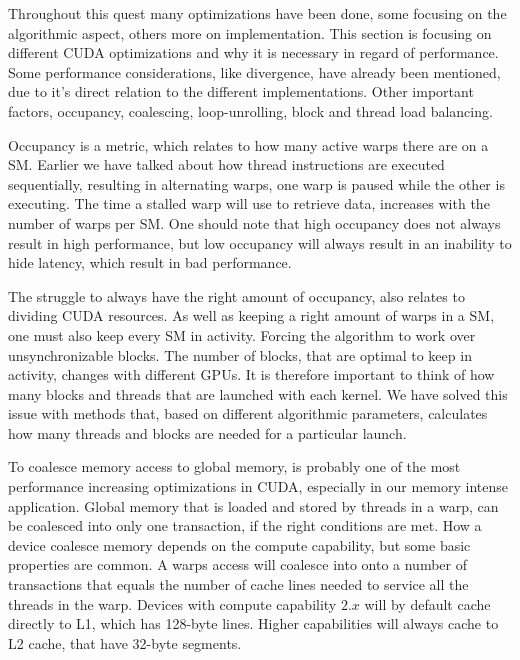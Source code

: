 Throughout this quest many optimizations have been done, some focusing on the algorithmic aspect, others more on implementation. This section is focusing on different CUDA optimizations and why it is necessary in regard of performance. Some performance considerations, like divergence, have already been mentioned, due to it's direct relation to the different implementations. Other important factors, occupancy, coalescing, loop-unrolling, block and thread load balancing.

Occupancy is a metric, which relates to how many active warps there are on a SM. Earlier we have talked about how thread instructions are executed sequentially, resulting in alternating warps, one warp is paused while the other is executing. The time a stalled warp will use to retrieve data, increases with the number of warps per SM. One should note that high occupancy does not always result in high performance, but low occupancy will always result in an inability to hide latency, which result in bad performance.

The struggle to always have the right amount of occupancy, also relates to dividing CUDA resources. As well as keeping a right amount of warps in a SM, one must also keep every SM in activity. Forcing the algorithm to work over unsynchronizable blocks. The number of blocks, that are optimal to keep in activity, changes with different GPUs. It is therefore important to think of how many blocks and threads that are launched with each kernel. We have solved this issue with methods that, based on different algorithmic parameters, calculates how many threads and blocks are needed for a particular launch.

To coalesce memory access to global memory, is probably one of the most performance increasing optimizations in CUDA, especially in our memory intense application. Global memory that is loaded and stored by threads in a warp, can be coalesced into only one transaction, if the right conditions are met. How a device coalesce memory depends on the compute capability, but some basic properties are common. A warps access will coalesce into onto a number of transactions that equals the number of cache lines needed to service all the threads in the warp. Devices with compute capability $2.x$ will by default cache directly to L1, which has 128-byte lines. Higher capabilities will always cache to L2 cache, that have 32-byte segments\cite{cuda_c_best_practices_guide}. 


